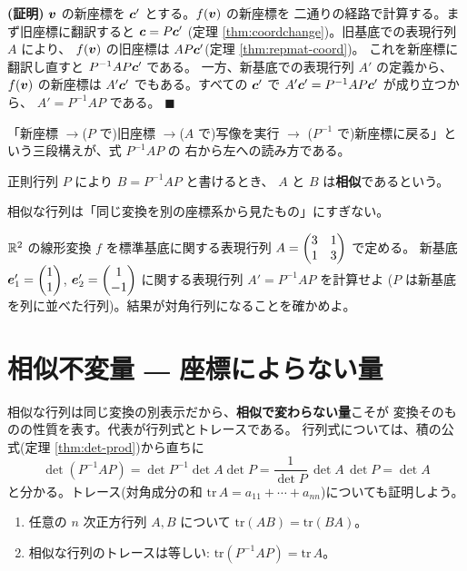 \noindent\textbf{(証明)}\quad
$\bm{v}$ の新座標を $\bm{c}'$ とする。$f(\bm{v})$ の新座標を
二通りの経路で計算する。まず旧座標に翻訳すると $\bm{c} = P\bm{c}'$
(定理 \ref{thm:coordchange})。旧基底での表現行列 $A$ により、
$f(\bm{v})$ の旧座標は $AP\bm{c}'$(定理 \ref{thm:repmat-coord})。
これを新座標に翻訳し直すと $P^{-1}AP\bm{c}'$ である。
一方、新基底での表現行列 $A'$ の定義から、$f(\bm{v})$ の新座標は
$A'\bm{c}'$ でもある。すべての $\bm{c}'$ で
$A'\bm{c}' = P^{-1}AP\bm{c}'$ が成り立つから、
$A' = P^{-1}AP$ である。 $\blacksquare$

「新座標 $\to$($P$ で)旧座標 $\to$($A$ で)写像を実行 $\to$
($P^{-1}$ で)新座標に戻る」という三段構えが、式 $P^{-1}AP$ の
右から左への読み方である。

\begin{teigi}[相似]
正則行列 $P$ により $B = P^{-1}AP$ と書けるとき、
$A$ と $B$ は\textbf{相似}であるという。
\end{teigi}

相似な行列は「同じ変換を別の座標系から見たもの」にすぎない。

\begin{mondai}\label{q:repmat}
$\mathbb{R}^2$ の線形変換 $f$ を標準基底に関する表現行列
$A = \begin{pmatrix}3 & 1 \\ 1 & 3\end{pmatrix}$ で定める。
新基底 $\bm{e}'_1 = \begin{pmatrix}1 \\ 1\end{pmatrix}$, $\bm{e}'_2 = \begin{pmatrix}1 \\ -1\end{pmatrix}$
に関する表現行列 $A' = P^{-1}AP$ を計算せよ
($P$ は新基底を列に並べた行列)。結果が対角行列になることを確かめよ。
\end{mondai}

\section{相似不変量 ― 座標によらない量}

相似な行列は同じ変換の別表示だから、\textbf{相似で変わらない量}こそが
変換そのものの性質を表す。代表が行列式とトレースである。
行列式については、積の公式(定理 \ref{thm:det-prod})から直ちに
\[
\det(P^{-1}AP) = \det P^{-1} \det A \det P
= \frac{1}{\det P}\,\det A\,\det P = \det A
\]
と分かる。トレース(対角成分の和
$\mathrm{tr}\,A = a_{11} + \cdots + a_{nn}$)についても証明しよう。

\begin{teiri}[トレースの相似不変性]\label{thm:trace-similar}
\begin{enumerate}
\item 任意の $n$ 次正方行列 $A, B$ について
$\mathrm{tr}(AB) = \mathrm{tr}(BA)$。
\item 相似な行列のトレースは等しい:
$\mathrm{tr}(P^{-1}AP) = \mathrm{tr}\,A$。
\end{enumerate}
\end{teiri}

